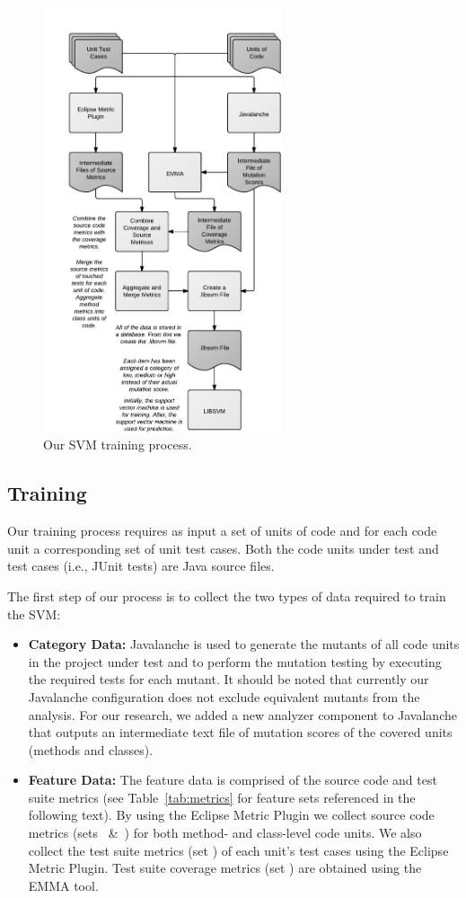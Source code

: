 \documentclass[10pt,conference,compsocconf]{IEEEtran}
\begin{document}
\begin{figure}[!t]
  \centering
  \includegraphics[width=7cm]{figures/process.pdf}
  \caption{Our SVM training process.}
  \label{fig:process}
\end{figure}


\subsection{Training}
\label{subsec:training}
Our training process requires as input a set of units of code and for each code unit a corresponding set of unit test cases. Both the code units under test and test cases (i.e., JUnit tests) are Java source files.

The first step of our process is to collect the two types of data required to train the SVM:

\begin{itemize}
  \item \textbf{Category Data:} Javalanche is used to generate the mutants of all code units in the project under test and to perform the mutation testing by executing the required tests for each mutant. It should be noted that currently our Javalanche configuration does not exclude equivalent mutants from the analysis. For our research, we added a new analyzer component to Javalanche that outputs an intermediate text file of mutation scores of the covered units (methods and classes).

  \item \textbf{Feature Data:} The feature data is comprised of the source code and test suite metrics (see Table~\ref{tab:metrics} for feature sets referenced in the following text). By using the Eclipse Metric Plugin we collect source code metrics (sets ~\&~) for both method- and class-level code units. We also collect the test suite metrics (set ) of each unit's test cases using the Eclipse Metric Plugin. Test suite coverage metrics (set ) are obtained using the EMMA tool.
\end{itemize}
\end{document}
